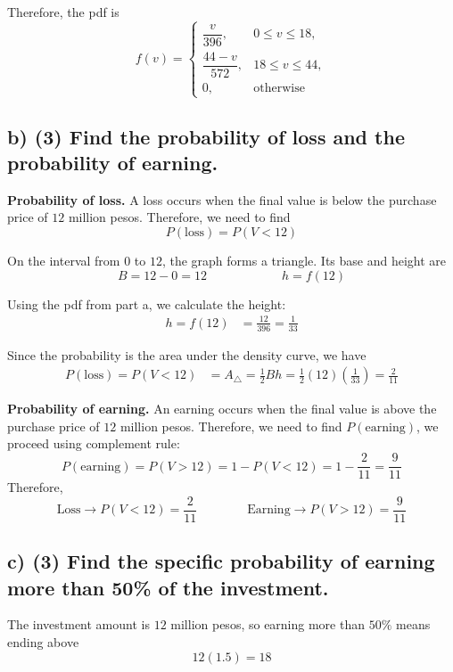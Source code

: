 Therefore, the pdf is
\[
f(v)=
\begin{cases}
	\dfrac{v}{396}, & 0\le v\le 18,\\[6pt]
	\dfrac{44-v}{572}, & 18\le v\le 44,\\[6pt]
	0, & \text{otherwise}
\end{cases}
\]


\subsection*{b) \textbf{(3)} Find the probability of loss and the probability of earning.}
\label{subsec:small-business-investment-c3-b}
\textbf{Probability of loss.} A loss occurs when the final value is below the purchase price of $12$ million pesos. Therefore, we need to find
\[
P(\text{loss})=P(V<12)
\]

On the interval from $0$ to $12$, the graph forms a triangle. Its base and height are
\[
B=12-0=12
\qquad \qquad \qquad
h=f(12)
\]

Using the pdf from part a, we calculate the height:
\[
\begin{aligned}
	h=f(12)
	&=\frac{12}{396}
	=\frac{1}{33}
\end{aligned}
\]

Since the probability is the area under the density curve, we have
\[
\begin{aligned}
	P(\text{loss})=P(V<12)
	&=A_{\triangle}
	=\frac{1}{2}Bh
	=\frac{1}{2}(12)\left(\frac{1}{33}\right)
	=\frac{2}{11}
\end{aligned}
\]

\textbf{Probability of earning.} An earning occurs when the final value is above the purchase price of $12$ million pesos. Therefore, we need to find $P(\text{earning})$, we proceed using complement rule:
\[
P(\text{earning})=P(V>12)=1-P(V<12) =1-\frac{2}{11}
=\frac{9}{11}
\]
Therefore,
\[
\text{Loss} \rightarrow P(V<12)=\frac{2}{11}
\qquad\qquad
\text{Earning} \rightarrow P(V>12)=\frac{9}{11}
\]



\subsection*{c) \textbf{(3)} Find the specific probability of earning more than 50\% of the investment.}
\label{subsec:small-business-investment-c3-c}
The investment amount is $12$ million pesos, so earning more than $50\%$ means ending above
\[
12(1.5)=18
\]

